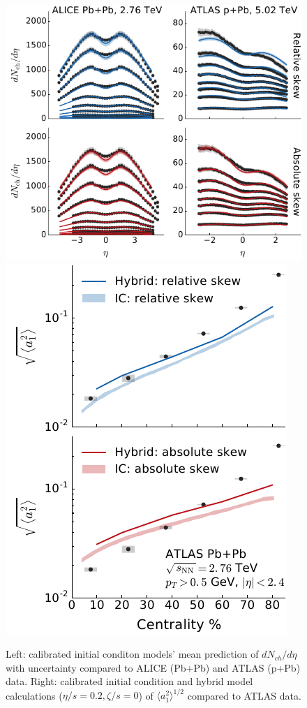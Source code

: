 \documentclass[3p,times,twocolumn]{elsarticle}
\begin{document}
\begin{center}
\begin{figure}
\includegraphics[scale=0.86]{chg_particle_rapidity.pdf}
\hfill
\includegraphics[scale=0.86]{fw_correlation_a1.pdf}
\caption{
	\label{fig:calibrate}
	Left: calibrated initial conditon models' mean prediction of $dN_{ch}/d\eta$ with uncertainty compared to ALICE (Pb+Pb) and ATLAS (p+Pb) data. Right: calibrated initial condition and hybrid model calculations ($\eta/s=0.2, \zeta/s=0$) of $\langle a_1^2\rangle^{1/2}$ compared to ATLAS data.
	}
\end{figure}
\end{center}
\end{document}
